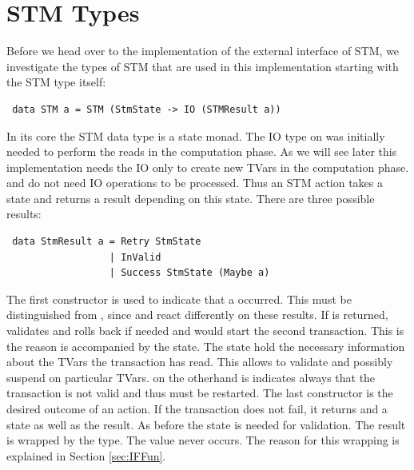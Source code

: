 \section{STM Types}
Before we head over to the implementation of the external interface of STM, we investigate the types
of STM that are used in this implementation starting with the STM type itself:
\begin{lstlisting}
 data STM a = STM (StmState -> IO (STMResult a))
\end{lstlisting}
In its core the STM data type is a state monad. The IO type on was initially needed to perform the reads 
in the computation phase. As we will see later this implementation needs the IO only to create new TVars
in the computation phase.  and  do not need IO operations to be processed.
Thus an STM action takes a state and returns a result depending on this state. There are three possible 
results:
\begin{lstlisting}
 data StmResult a = Retry StmState
                  | InValid
                  | Success StmState (Maybe a)
\end{lstlisting}
The first constructor is used to indicate that a  occurred. This must be distinguished from 
, since  and  react differently on these results. If 
 is returned,  validates and rolls back if needed and  
would start the second transaction. This is the reason  is accompanied by the state.
The state hold the necessary information about the TVars the transaction has read. This allows 
to validate and possibly suspend on particular TVars.  on the otherhand is indicates
always that the transaction is not valid and thus must be restarted. 
The last constructor is the desired outcome of an action. If the transaction does not fail, it returns
 and a state as well as the result. As before the state is needed for validation.
The result is wrapped by the  type. The value  never occurs. 
The reason for this wrapping is explained in Section \ref{sec:IFFun}. 

